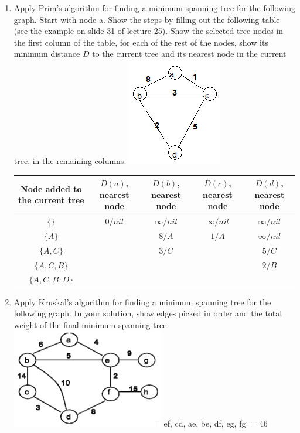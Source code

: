 \documentclass{article}
\begin{document}
\begin{enumerate}
    \item Apply Prim's algorithm for finding a minimum spanning tree for the 
    following graph. Start with node a. Show the steps by filling out the 
    following table (see the example on slide 31 of lecture 25). Show the 
    selected tree nodes in the first column of the table, for each of the rest 
    of the nodes, show its minimum distance $D$ to the current tree and its 
    nearest node in the current tree, in the remaining columns.\newline
    \includegraphics[scale=0.75]{p4_graph}\newline
    \begin{tabular}{|c |c |c |c |c|}
        \hline
        Node added to the current tree & $D(a)$, nearest node & $D(b)$, 
        nearest node & $D(c)$, nearest node & $D(d)$, nearest node\\
        \hline
        $\{\}$ & $0/nil$ & $\infty/nil$ & $\infty/nil$ & $\infty/nil$\\
        \hline
        $\{A\}$ & & $8/A$ & $1/A$ & $\infty/nil$\\
        \hline
        $\{A,C\}$ & & $3/C$ & & $5/C$\\
        \hline
        $\{A,C,B\}$ & & & & $2/B$ \\
        \hline
        $\{A,C,B,D\}$ & & & & \\
        \hline
    \end{tabular}
    
    \item Apply Kruskal’s algorithm for finding a minimum spanning tree for 
    the following graph. In your solution, show edges picked in order and the 
    total weight of the final minimum spanning tree.\newline
    \includegraphics[scale=0.75]{p5_graph}\newline
    ef, cd, ae, be, df, eg, fg $= 46$


\end{enumerate}
\end{document}
